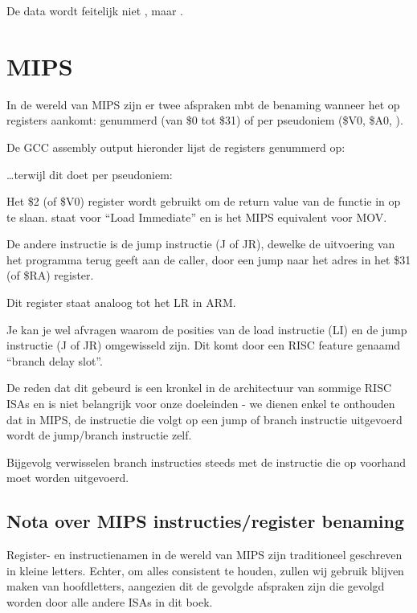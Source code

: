 De data wordt feitelijk niet , maar .

\ifdefined\IncludeMIPS
\section{MIPS}

\label{MIPS_leaf_function_ex1}
In de wereld van MIPS zijn er twee afspraken mbt de benaming wanneer het op registers aankomt:
genummerd (van \$0 tot \$31) of per pseudoniem (\$V0, \$A0, \etc{}).

De GCC assembly output hieronder lijst de registers genummerd op:



\dots terwijl \IDA dit doet per pseudoniem:



Het \$2 (of \$V0) register wordt gebruikt om de return value van de functie in op te slaan.
 staat voor ``Load Immediate'' en is het MIPS equivalent voor MOV.

De andere instructie is de jump instructie (J of JR), dewelke de uitvoering van het programma terug geeft aan de \gls{caller}, door een jump naar het adres in het \$31 (of \$RA) register.

Dit register staat analoog tot het \ac{LR} in ARM.

Je kan je wel afvragen waarom de posities van de load instructie (LI) en de jump instructie (J of JR) omgewisseld zijn. Dit komt door een \ac{RISC} feature genaamd ``branch delay slot''.

De reden dat dit gebeurd is een kronkel in de architectuur van sommige RISC \ac{ISA}s en is niet belangrijk voor onze doeleinden - we dienen enkel te onthouden dat in MIPS, de instructie die volgt op een jump of branch instructie uitgevoerd wordt  de jump/branch instructie zelf.

Bijgevolg verwisselen branch instructies steeds met de instructie die op voorhand moet worden uitgevoerd.

\subsection{Nota over MIPS instructies/register benaming}

Register- en instructienamen in de wereld van MIPS zijn traditioneel geschreven in kleine letters.
Echter, om alles consistent te houden, zullen wij gebruik blijven maken van hoofdletters, aangezien dit de gevolgde afspraken zijn die gevolgd worden door alle andere \ac{ISA}s in dit boek.

\fi %

